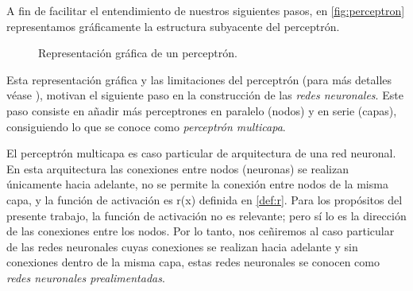 \documentclass[12pt, a4paper, twoside]{book}
\numberwithin{equation}{section}
\theoremstyle{definition}
\theoremstyle{remark}
\theoremstyle{plain}
\begin{document}
	A fin de facilitar el entendimiento de nuestros siguientes pasos, 
	en \autoref{fig:perceptron} representamos gráficamente la estructura 
	subyacente del perceptrón.
	\begin{figure}[!htbp]
		\centering
		\caption{Representación gráfica de un perceptrón.}
		\label{fig:perceptron}
	\end{figure}

	Esta representación gráfica y las limitaciones del perceptrón (para 
	más detalles véase \cite{Perceptron-Convergencia}), motivan el 
	siguiente paso en la 
	construcción de las \emph{redes neuronales}. Este paso consiste en 
	añadir más perceptrones en paralelo (nodos) y en serie (capas), 
	consiguiendo lo que se conoce como \emph{perceptrón multicapa}.

	El perceptrón multicapa es caso particular de arquitectura de una red 
	neuronal. En esta arquitectura las conexiones entre nodos (neuronas) 
	se realizan únicamente hacia adelante, no se permite la conexión 
	entre nodos de la misma capa, y la función de activación es 
	r(x) definida en \ref{def:r}. Para los propósitos del presente 
	trabajo, la función de activación no es relevante; pero sí lo es la 
	dirección de las conexiones entre los nodos. Por lo tanto, nos 
	ceñiremos al caso particular de las redes neuronales cuyas conexiones
	se realizan hacia adelante y sin conexiones dentro de la misma capa, 
	estas redes neuronales se conocen como \emph{redes neuronales 
	prealimentadas}. 
	
\end{document}
